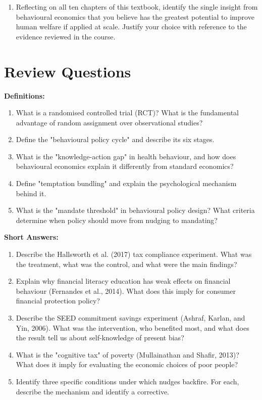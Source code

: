 \documentclass[12pt, letterpaper]{article}
\begin{document}
\begin{enumerate}
\item Reflecting on all ten chapters of this textbook, identify the single insight from behavioural economics that you believe has the greatest potential to improve human welfare if applied at scale. Justify your choice with reference to the evidence reviewed in the course.
\end{enumerate}

\medskip


\section*{Review Questions}


\textbf{Definitions:}
\begin{enumerate}
\item What is a randomised controlled trial (RCT)? What is the fundamental advantage of random assignment over observational studies?
\item Define the "behavioural policy cycle" and describe its six stages.
\item What is the "knowledge-action gap" in health behaviour, and how does behavioural economics explain it differently from standard economics?
\item Define "temptation bundling" and explain the psychological mechanism behind it.
\item What is the "mandate threshold" in behavioural policy design? What criteria determine when policy should move from nudging to mandating?
\end{enumerate}

\textbf{Short Answers:}
\begin{enumerate}
\item Describe the Hallsworth et al. (2017) tax compliance experiment. What was the treatment, what was the control, and what were the main findings?
\item Explain why financial literacy education has weak effects on financial behaviour (Fernandes et al., 2014). What does this imply for consumer financial protection policy?
\item Describe the SEED commitment savings experiment (Ashraf, Karlan, and Yin, 2006). What was the intervention, who benefited most, and what does the result tell us about self-knowledge of present bias?
\item What is the "cognitive tax" of poverty (Mullainathan and Shafir, 2013)? What does it imply for evaluating the economic choices of poor people?
\item Identify three specific conditions under which nudges backfire. For each, describe the mechanism and identify a corrective.
\end{enumerate}
\end{document}
